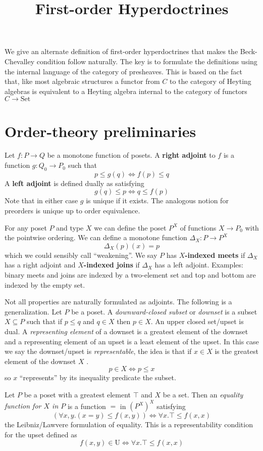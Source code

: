 \documentclass{article}
\newcommand{\Set}{\textrm{Set}}
\begin{document}
\title{First-order Hyperdoctrines}

We give an alternate definition of first-order hyperdoctrines that
makes the Beck-Chevalley condition follow naturally. The key is to
formulate the definitions using the internal language of the category
of presheaves. This is based on the fact that, like most algebraic
structures a functor from $C$ to the category of Heyting algebras is
equivalent to a Heyting algebra internal to the category of functors
$C \to \Set$


\section{Order-theory preliminaries}

Let $f : P \to Q$ be a monotone function of posets. A \textbf{right
  adjoint} to $f$ is a function $g : Q_0 \to P_0$ such that
\[ p \leq g(q) \iff f(p) \leq q \]
A \textbf{left adjoint} is defined dually as satisfying
\[ g(q) \leq p \iff q \leq f(p) \]
Note that in either case $g$ is unique if it exists. The analogous
notion for preorders is unique up to order equivalence.

For any poset $P$ and type $X$ we can define the poset $P^X$ of
functions $X \to P_0$ with the pointwise ordering. We can define a
monotone function $\Delta_X : P \to P^X$
\[ \Delta_X(p)(x) = p \]
which we could sensibly call ``weakening''.
We say $P$ has \textbf{$X$-indexed meets} if $\Delta_X$ has a right
adjoint and \textbf{$X$-indexed joins} if $\Delta_X$ has a left
adjoint. Examples: binary meets and joins are indexed by a two-element
set and top and bottom are indexed by the empty set.

Not all properties are naturally formulated as adjoints. The following
is a generalization.  Let $P$ be a poset. A \emph{downward-closed
subset} or \emph{downset} is a subset $X \subseteq P$ such that if $p
\leq q$ and $q \in X$ then $p \in X$. An upper closed set/upset is
dual. A \emph{representing element} of a downset is a greatest element
of the downset and a representing element of an upset is a least
element of the upset. In this case we say the downset/upset is
\emph{representable}, the idea is that if $x \in X$ is the greatest
element of the downset $X$ .
\[ p \in X \iff p \leq x \]
so $x$ ``represents'' by its inequality predicate the subset.

Let $P$ be a poset with a greatest element $\top$ and $X$ be a
set. Then an \emph{equality function for $X$ in $P$} is a function $=$
in $(P^X)^X$ satisfying
\[ (\forall x,y. (x = y) \leq f(x,y)) \iff \forall x. \top \leq f(x,x) \]
the Leibniz/Lawvere formulation of equality. This is a
representability condition for the upset defined as
\[ f(x,y) \in \textrm{U} \iff \forall x. \top \leq f(x,x) \]
\end{document}
